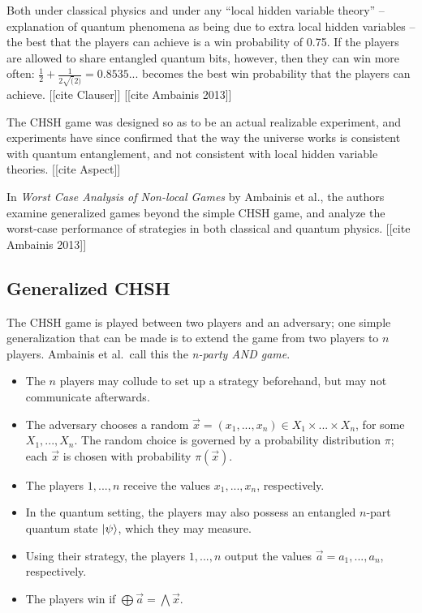 Both under classical physics and under any ``local hidden variable theory'' -- explanation of quantum phenomena as being due to extra local hidden variables -- the best that the players can achieve is a win probability of 0.75. If the players are allowed to share entangled quantum bits, however, then they can win more often: $\frac12 + \frac1{2\sqrt(2)} = 0.8535$... becomes the best win probability that the players can achieve. [[cite Clauser]] [[cite Ambainis 2013]]

The CHSH game was designed so as to be an actual realizable experiment, and experiments have since confirmed that the way the universe works is consistent with quantum entanglement, and not consistent with local hidden variable theories. [[cite Aspect]]

In \emph{Worst Case Analysis of Non-local Games} by Ambainis et al., the authors examine generalized games beyond the simple CHSH game, and analyze the worst-case performance of strategies in both classical and quantum physics. [[cite Ambainis 2013]]


\subsection{Generalized CHSH}

The CHSH game is played between two players and an adversary; one simple generalization that can be made is to extend the game from two players to $n$ players. Ambainis et al.~call this the \emph{n-party AND game}.

\begin{itemize}
\item{The $n$ players may collude to set up a strategy beforehand, but may not communicate afterwards.}
\item{The adversary chooses a random $\vec{x}=(x_1, ..., x_n) \in X_1 \times ... \times X_n$, for some $X_1, ..., X_n$. The random choice is governed by a probability distribution $\pi$; each $\vec{x}$ is chosen with probability $\pi(\vec{x})$.}
\item{The players $1, ..., n$ receive the values $x_1, ..., x_n$, respectively.}
\item{In the quantum setting, the players may also possess an entangled $n$-part quantum state $\ket{\psi}$, which they may measure.}
\item{Using their strategy, the players $1, ..., n$ output the values $\vec{a} = a_1, ..., a_n$, respectively.}
\item{The players win if $\bigoplus \vec{a} = \bigwedge \vec{x}$.}
\end{itemize}

